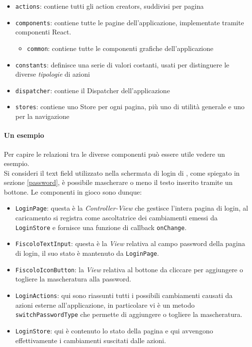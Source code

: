 \begin{itemize}
\item \texttt{actions}: contiene tutti gli action creators, suddivisi per pagina
\item \texttt{components}: contiene tutte le pagine dell'applicazione, implementate tramite
componenti React.
	\begin{itemize}
	\item \texttt{common}: contiene tutte le componenti grafiche dell'applicazione
	\end{itemize}
\item \texttt{constants}: definisce una serie di valori costanti, usati per distinguere
le diverse \textit{tipologie} di azioni
\item \texttt{dispatcher}: contiene il Dispatcher dell'applicazione
\item \texttt{stores}: contiene uno Store per ogni pagina, più uno di utilità generale e uno
per la navigazione
\end{itemize}

\paragraph{Un esempio}
Per capire le relazioni tra le diverse componenti può essere utile vedere un esempio. \\

Si consideri il text field utilizzato nella schermata di login di \fiscoloMobile{},
come spiegato in sezione \ref{password}, è possibile mascherare o meno il testo
inserito tramite un bottone.
Le componenti in gioco sono dunque:

\begin{itemize}
\item \texttt{LoginPage}: questa è la \textit{Controller-View} che gestisce l'intera
pagina di login, al caricamento si registra come ascoltatrice dei cambiamenti emessi
da \texttt{LoginStore} e fornisce una funzione di callback \texttt{onChange}.
\item \texttt{FiscoloTextInput}: questa è la \textit{View} relativa al campo password
della pagina di login, il suo stato è mantenuto da \texttt{LoginPage}.
\item \texttt{FiscoloIconButton}: la \textit{View} relativa al bottone da cliccare per
aggiungere o togliere la mascheratura alla password.
\item \texttt{LoginActions}: qui sono riassunti tutti i possibili cambiamenti causati
da azioni esterne all'applicazione, in particolare vi è un metodo \texttt{switchPasswordType}
che permette di aggiungere o togliere la mascheratura.
\item \texttt{LoginStore}: qui è contenuto lo stato della pagina e qui avvengono effettivamente
i cambiamenti suscitati dalle azioni.
\end{itemize}

